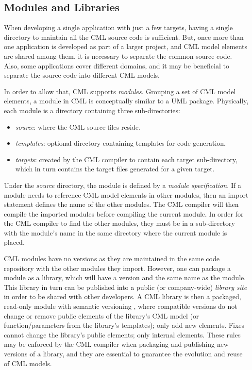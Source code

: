 \subsection{Modules and Libraries}\label{subsec:modlib}

When developing a single application with just a few targets,
having a single directory to maintain all the CML source code is sufficient.
But, once more than one application is developed as part of a larger project,
and CML model elements are shared among them,
it is necessary to separate the common source code.
Also, some applications cover different domains,
and it may be beneficial to separate the source code into different CML models.

In order to allow that, CML supports \emph{modules}.
Grouping a set of CML model elements,
a module in CML is conceptually similar to a UML \cite{uml} package.
Physically, each module is a directory containing three sub-directories:

\begin{itemize}
\item \emph{source}: where the CML source files reside.
\item \emph{templates}: optional directory containing templates for code generation.
\item \emph{targets}: created by the CML compiler to contain each target sub-directory, which in turn contains the target files generated for a given target.
\end{itemize}

Under the \emph{source} directory, the module is defined by a \emph{module specification}.
If a module needs to reference CML model elements in other modules,
then an import statement defines the name of the other modules.
The CML compiler will then compile the imported modules
before compiling the current module.
In order for the CML compiler to find the other modules,
they must be in a sub-directory with the module's name
in the same directory where the current module is placed.

CML modules have no versions
as they are maintained in the same code repository with the other modules they import.
However, one can package a module as a library,
which will have a version and the same name as the module.
This library in turn can be published into a public (or company-wide) \emph{library site}
in order to be shared with other developers.
A CML library is then a packaged, read-only module with semantic versioning \cite{semver},
where compatible versions do not change or remove public elements of the library's CML model (or function/parameters from the library's templates); only add new elements.
Fixes cannot change the library's public elements; only internal elements.
These rules may be enforced by the CML compiler when packaging and publishing new versions of a library, and they are essential to guarantee the evolution and reuse of CML models.
